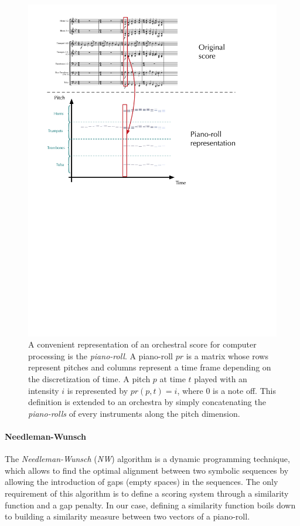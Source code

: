 \documentclass[twoside,twocolumn]{article}
\begin{document}
\begin{figure}[ht]
\centering
\includegraphics[scale=0.40]{Data_representation/from_score_to_pianoroll}
\caption{A convenient representation of an orchestral score for computer processing is the \textit{piano-roll}. A piano-roll $pr$ is a matrix whose rows represent pitches and columns represent a time frame depending on the discretization of time. A pitch $p$ at time $t$ played with an intensity $i$ is represented by $pr(p,t) = i$, where $0$ is a note off. This definition is extended to an orchestra by simply concatenating the \textit{piano-rolls} of every instruments along the pitch dimension.}
\label{fig:piano-roll}
\end{figure}

\paragraph{Needleman-Wunsch}
The \textit{Needleman-Wunsch} (\textit{NW}) algorithm \cite{NEEDLEMAN1970443} is a dynamic programming technique, which allows to find the optimal alignment between two symbolic sequences by allowing the introduction of gaps (empty spaces) in the sequences.
The only requirement of this algorithm is to define a scoring system through a similarity function and a gap penalty. In our case, defining a similarity function boils down to building a similarity measure between two vectors of a piano-roll.
\end{document}
